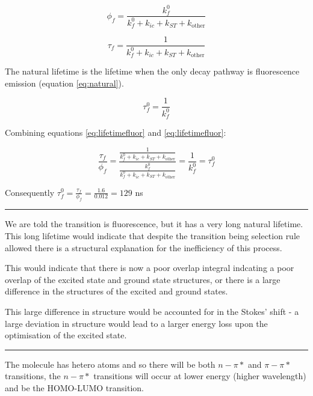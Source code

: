 \documentclass[
]{book}
\begin{document}
\begin{equation*}
\phi_f = \frac{k_f^0}{k_f^0+k_{ic}+ k_{ST}+k_{\textrm{other}}}
\end{equation*}

\begin{equation*}
\tau_f = \frac{1}{k_f^0+k_{ic}+ k_{ST}+k_{\textrm{other}}}
\end{equation*}

The natural lifetime is the lifetime when the only decay pathway is fluorescence emission (equation \eqref{eq:natural}).

\begin{equation*}
\tau_f^0 = \frac{1}{k_f^0}
\end{equation*}

Combining equations \eqref{eq:lifetimefluor} and \eqref{eq:lifetimefluor}:

\begin{equation*}
\frac{\tau_f}{\phi_f}=\frac{\frac{1}{k_f^0+k_{ic}+ k_{ST}+k_{\textrm{other}}}}{\frac{k_f^0}{k_f^0+k_{ic}+ k_{ST}+k_{\textrm{other}}}}=\frac{1}{k_f^0}=\tau_f^0
\end{equation*}

Consequently \(\tau_f^0 = \frac{\tau_f}{\phi_f}=\frac{1.6}{0.012}= 129\) ns

\begin{center}\rule{0.5\linewidth}{0.5pt}\end{center}

We are told the transition is fluorescence, but it has a very long natural lifetime. This long lifetime would indicate that despite the transition being selection rule allowed there is a structural explanation for the inefficiency of this process.

This would indicate that there is now a poor overlap integral indcating a poor overlap of the excited state and ground state structures, or there is a large difference in the structures of the excited and ground states.

This large difference in structure would be accounted for in the Stokes' shift - a large deviation in structure would lead to a larger energy loss upon the optimisation of the excited state.

\begin{center}\rule{0.5\linewidth}{0.5pt}\end{center}

The molecule has hetero atoms and so there will be both \(n-\pi*\) and \(\pi-\pi*\) transitions, the \(n-\pi*\) transitions will occur at lower energy (higher wavelength) and be the HOMO-LUMO transition.
\end{document}
